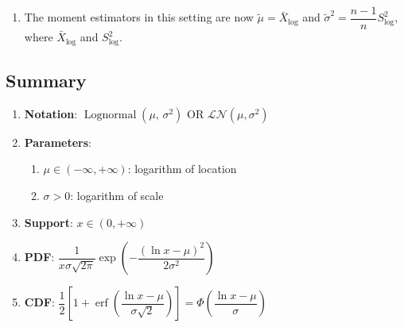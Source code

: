 \begin{enumerate}
\begin{enumerate}
        \item The moment estimators in this setting are now $\tilde{\mu} = \bar{X}_{\log}$ and $\tilde{\sigma}^ 2 = \dfrac{n - 1}{n}S^2 _{\log}$, where $\bar{X}_{\log}$ and $S^2 _{\log} $.
        \hfill \cite{statistics/book/Statistics-for-Data-Scientists/Maurits-Kaptein}
    \end{enumerate}

\end{enumerate}





\subsection{Summary}

\begin{enumerate}
    \item \textbf{Notation}:
    ${\displaystyle \operatorname {Lognormal} \left(\mu ,\,\sigma ^{2}\right)}$
    OR
    $\mathcal{L N} (\mu, \sigma^2)$
    \hfill \cite{wiki/Log-normal_distribution, statistics/book/Statistics-for-Data-Scientists/Maurits-Kaptein}

    \item \textbf{Parameters}:
    \begin{enumerate}
        \item ${\displaystyle \mu \in (-\infty ,+\infty )}$: logarithm of location
        \hfill \cite{wiki/Log-normal_distribution, statistics/book/Statistics-for-Data-Scientists/Maurits-Kaptein}

        \item ${\displaystyle \sigma >0}$: logarithm of scale
        \hfill \cite{wiki/Log-normal_distribution, statistics/book/Statistics-for-Data-Scientists/Maurits-Kaptein}
    \end{enumerate}

    \item \textbf{Support}: ${\displaystyle x\in (0,+\infty )}$
    \hfill \cite{wiki/Log-normal_distribution, statistics/book/Statistics-for-Data-Scientists/Maurits-Kaptein}

    \item \textbf{PDF}:
    ${\displaystyle {\dfrac {1}{x\sigma {\sqrt {2\pi }}}}\exp \left(-{\dfrac {\left(\ln x-\mu \right)^{2}}{2\sigma ^{2}}}\right)}$
    \hfill \cite{wiki/Log-normal_distribution, statistics/book/Statistics-for-Data-Scientists/Maurits-Kaptein}

    \item \textbf{CDF}:
    $
        {\displaystyle {{\dfrac {1}{2}}\left[1+\operatorname {erf} \left({\dfrac {\ln x-\mu }{\sigma {\sqrt {2}}}}\right)\right]
        =\Phi {\left({\dfrac {\ln x-\mu }{\sigma }}\right)}}}
    $
    \hfill \cite{wiki/Log-normal_distribution}


\end{enumerate}
